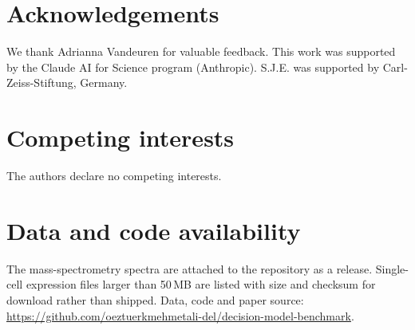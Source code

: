 \documentclass[10pt,twocolumn]{article}
\begin{document}
\section*{Acknowledgements}
We thank Adrianna Vandeuren for valuable feedback. This work was supported by the Claude AI for Science program (Anthropic). S.J.E. was supported by Carl-Zeiss-Stiftung, Germany.

\section*{Competing interests}
The authors declare no competing interests.

\section*{Data and code availability}
The mass-spectrometry spectra are attached to the repository as a release. Single-cell expression files larger than 50\,MB are listed with size and checksum for download rather than shipped. Data, code and paper source: \url{https://github.com/oeztuerkmehmetali-del/decision-model-benchmark}.
\end{document}
